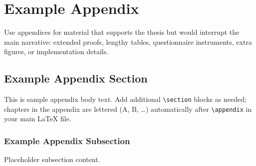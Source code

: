 \chapter{Example Appendix}

Use appendices for material that supports the thesis but would interrupt the main narrative: extended proofs, lengthy tables, questionnaire instruments, extra figures, or implementation details.

\section{Example Appendix Section}

This is sample appendix body text. Add additional \verb|\section| blocks as needed; chapters in the appendix are lettered (A, B, \ldots) automatically after \verb|\appendix| in your main LaTeX file.

\subsection{Example Appendix Subsection}

Placeholder subsection content.
